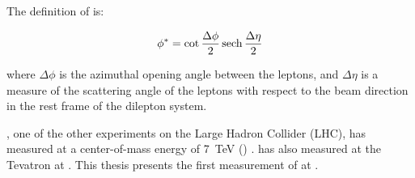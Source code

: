 The definition of \phistar is:

\begin{equation}\label{eq:phistar}
    \phi^{*} = \cot \frac{\Delta \phi}{2} \operatorname{sech} \frac{\Delta \eta}{2}
\end{equation}

where $\Delta \phi$ is the azimuthal opening angle between the leptons,
and $\Delta \eta$ is a measure of the scattering angle of the leptons with
respect to the beam direction in the rest frame of the dilepton system.

\ATLAS, one of the other experiments on the Large Hadron Collider (LHC), has
measured \phistar at a center-of-mass energy of \SI{7}{\TeV} (\rootsseven)
\cite{atlas_phistar}. \DZERO has also measured \phistar at the Tevatron at
\rootsTevatron \cite{d0_phistar_2011}\cite{d0_phistar_2014}. This thesis
presents the first measurement of \phistar at \rootseight.
